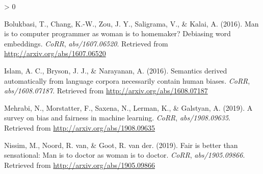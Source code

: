 \documentclass[
  12pt,
]{book}
\newlength{\cslhangindent}
\newenvironment{CSLReferences}[2] %
 {%
  \setlength{\parindent}{0pt}
  \ifodd #1 \everypar{\setlength{\hangindent}{\cslhangindent}}\ignorespaces\fi
  \ifnum #2 > 0
  \setlength{\parskip}{#2\baselineskip}
  \fi
 }%
 {}
\begin{document}
\hypertarget{refs}{}
\begin{CSLReferences}{1}{0}
\leavevmode\hypertarget{ref-Bolukbasi2016Man}{}%
Bolukbasi, T., Chang, K.-W., Zou, J. Y., Saligrama, V., \& Kalai, A. (2016). Man is to computer programmer as woman is to homemaker? Debiasing word embeddings. \emph{CoRR}, \emph{abs/1607.06520}. Retrieved from \url{http://arxiv.org/abs/1607.06520}

\leavevmode\hypertarget{ref-Caliskan2017Semantics}{}%
Islam, A. C., Bryson, J. J., \& Narayanan, A. (2016). Semantics derived automatically from language corpora necessarily contain human biases. \emph{CoRR}, \emph{abs/1608.07187}. Retrieved from \url{http://arxiv.org/abs/1608.07187}

\leavevmode\hypertarget{ref-Mehrabi2019Survey}{}%
Mehrabi, N., Morstatter, F., Saxena, N., Lerman, K., \& Galstyan, A. (2019). A survey on bias and fairness in machine learning. \emph{CoRR}, \emph{abs/1908.09635}. Retrieved from \url{http://arxiv.org/abs/1908.09635}

\leavevmode\hypertarget{ref-Nissim2019Fair}{}%
Nissim, M., Noord, R. van, \& Goot, R. van der. (2019). Fair is better than sensational: Man is to doctor as woman is to doctor. \emph{CoRR}, \emph{abs/1905.09866}. Retrieved from \url{http://arxiv.org/abs/1905.09866}

\end{CSLReferences}
\end{document}

